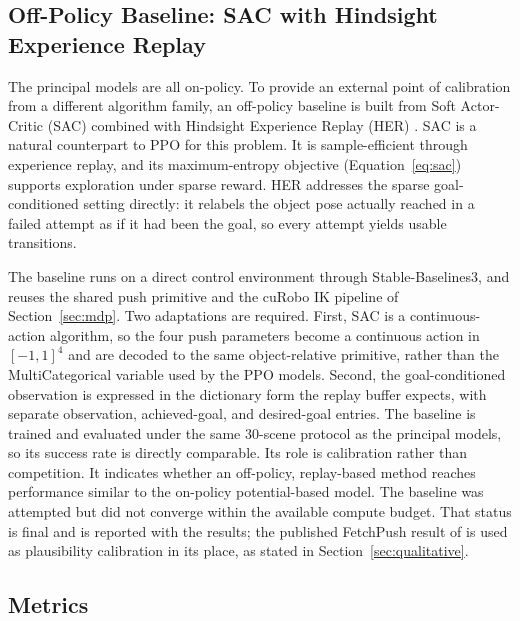 \subsection{Off-Policy Baseline: SAC with Hindsight Experience Replay}
\label{sec:sac_baseline}

The principal models are all on-policy. To provide an external point of
calibration from a different algorithm family, an off-policy baseline is built
from Soft Actor-Critic (SAC) \cite{Haarnoja2018SoftAO} combined with Hindsight
Experience Replay (HER) \cite{Andrychowicz2017}. SAC is a natural counterpart to
PPO for this problem. It is sample-efficient through experience replay, and its
maximum-entropy objective (Equation~\ref{eq:sac}) supports exploration under
sparse reward. HER addresses the sparse goal-conditioned setting directly: it
relabels the object pose actually reached in a failed attempt as if it had been
the goal, so every attempt yields usable transitions.

The baseline runs on a direct control environment through Stable-Baselines3, and
reuses the shared push primitive and the cuRobo IK pipeline of
Section~\ref{sec:mdp}. Two adaptations are required. First, SAC is a
continuous-action algorithm, so the four push parameters become a continuous
action in $[-1, 1]^4$ and are decoded to the same object-relative primitive,
rather than the MultiCategorical variable used by the PPO models. Second, the
goal-conditioned observation is expressed in the dictionary form the replay buffer
expects, with separate observation, achieved-goal, and desired-goal entries. The
baseline is trained and evaluated under the same 30-scene protocol as the
principal models, so its success rate is directly comparable. Its role is
calibration rather than competition. It indicates whether an off-policy,
replay-based method reaches performance similar to the on-policy potential-based
model. The baseline was attempted but did not converge within the available
compute budget. That status is final and is reported with the results; the
published FetchPush result of \cite{Andrychowicz2017} is used as plausibility
calibration in its place, as stated in Section~\ref{sec:qualitative}.

\subsection{Metrics}
\label{sec:metrics}

